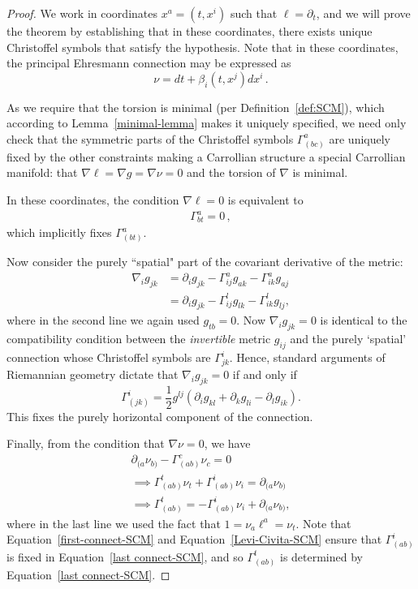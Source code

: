 \documentclass{article}
\theoremstyle{definition}
\theoremstyle{remark}
\begin{document}
\begin{proof}
    We work in coordinates $x^a = (t,x^i)$ such that $\ell = \partial_t$, and we will prove the theorem by establishing that in these coordinates, there exists unique Christoffel symbols that satisfy the hypothesis. Note that in these coordinates, the principal Ehresmann connection may be expressed as
    $$\nu = dt + \beta_i(t,x^j) dx^i\,.$$

    As we require that the torsion is minimal (per Definition~\ref{def:SCM}), which according to Lemma~\ref{minimal-lemma} makes it uniquely specified, we need only check that the symmetric parts of the Christoffel symbols $\Gamma^a_{(bc)}$ are uniquely fixed by the other constraints making a Carrollian structure a special Carrollian manifold: that $\nabla \ell = \nabla g = \nabla \nu = 0$ and the torsion of $\nabla$ is minimal.

    In these coordinates, the condition $\nabla \ell = 0$ is equivalent to
    \begin{align} \label{first-connect-SCM}
        \Gamma^a_{bt} = 0\,,
    \end{align}
    which implicitly fixes $\Gamma^a_{(bt)}$.

Now consider the purely ``spatial" part of the covariant derivative of the metric:
\begin{align*} \nabla_{i}g_{jk} & = \partial_i g_{jk} - \Gamma^a_{ij}g_{ak} - \Gamma^a_{ik}g_{aj} \\
&= \partial_i g_{jk} - \Gamma^l_{ij}g_{lk} - \Gamma^l_{ik}g_{lj},
\end{align*}
where in the second line we again used $g_{tb} = 0$. Now $\nabla_i g_{jk} = 0$ is identical to the compatibility condition between the \emph{invertible} metric $g_{ij}$ and the purely `spatial' connection whose Christoffel symbols are $\Gamma^i_{jk}$. Hence, standard arguments of Riemannian geometry dictate that $\nabla_i g_{jk} = 0$ if and only if
\begin{equation} \label{Levi-Civita-SCM}
\Gamma^i_{(jk)} = \frac{1}{2}g^{lj}(\partial_i g_{kl} + \partial_k g_{li} - \partial_l g_{ik}).
\end{equation}
This fixes the purely horizontal component of the connection.

Finally, from the condition that $\nabla \nu = 0$, we have 
\begin{align} 
\partial_{(a}\nu_{b)} - \Gamma^c_{(ab)}\nu_c  = 0 \label{last-connectEq1-SCM} \\
\implies \Gamma^t_{(ab)}\nu_t + \Gamma^i_{(ab)}\nu_i  = \partial_{(a}\nu_{b)}  \nonumber \\
\implies  \Gamma^t_{(ab)}  = - \Gamma^i_{(ab)}\nu_i + \partial_{(a}\nu_{b)}, \label{last connect-SCM}
\end{align}
where in the last line we used the fact that $1 = \nu_a\ell^a = \nu_t$. Note that Equation~\ref{first-connect-SCM} and Equation~\ref{Levi-Civita-SCM} ensure that $\Gamma^i_{(ab)}$ is fixed in Equation~\ref{last connect-SCM}, and so $\Gamma^t_{(ab)}$ is determined by Equation~\ref{last connect-SCM}.


\end{proof}
\end{document}
